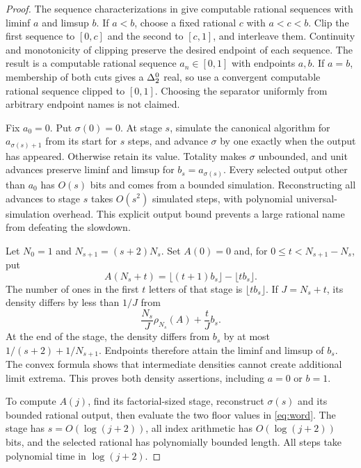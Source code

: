 \begin{proof}
The sequence characterizations in
\cite[Theorem~5.1 and Corollaries~5.4--5.5]{density} give computable
rational sequences with liminf $a$ and limsup $b$. If $a<b$, choose a
fixed rational $c$ with $a<c<b$. Clip the first sequence to $[0,c]$ and
the second to $[c,1]$, and interleave them. Continuity and monotonicity
of clipping preserve the desired endpoint of each sequence. The result
is a computable rational sequence $a_n\in[0,1]$ with endpoints $a,b$.
If $a=b$, membership of both cuts gives a $\Delta^0_2$ real, so use a
convergent computable rational sequence clipped to $[0,1]$. Choosing the
separator uniformly from arbitrary endpoint names is not claimed.

Fix $a_0=0$. Put $\sigma(0)=0$. At stage $s$, simulate the canonical
algorithm for $a_{\sigma(s)+1}$ from its start for $s$ steps, and advance
$\sigma$ by one exactly when the output has appeared. Otherwise retain
its value. Totality makes $\sigma$ unbounded, and unit advances preserve
liminf and limsup for $b_s=a_{\sigma(s)}$. Every selected output other
than $a_0$ has $O(s)$ bits and comes from a bounded simulation.
Reconstructing all advances to stage $s$ takes $O(s^2)$ simulated steps,
with polynomial universal-simulation overhead. This explicit output
bound prevents a large rational name from defeating the slowdown.

Let $N_0=1$ and $N_{s+1}=(s+2)N_s$. Set $A(0)=0$ and, for
$0\leq t<N_{s+1}-N_s$, put
\begin{equation}\label{eq:word}
 A(N_s+t)=\lfloor(t+1)b_s\rfloor-\lfloor t b_s\rfloor.
\end{equation}
The number of ones in the first $t$ letters of that stage is
$\lfloor t b_s\rfloor$. If $J=N_s+t$, its density differs by less than
$1/J$ from
\begin{equation}\label{eq:convex}
 \frac{N_s}{J}\rho_{N_s}(A)+\frac{t}{J}b_s.
\end{equation}
At the end of the stage, the density differs from $b_s$ by at most
$1/(s+2)+1/N_{s+1}$. Endpoints therefore attain the liminf and limsup
of $b_s$. The convex formula shows that intermediate densities cannot
create additional limit extrema. This proves both density assertions,
including $a=0$ or $b=1$.

To compute $A(j)$, find its factorial-sized stage, reconstruct
$\sigma(s)$ and its bounded rational output, then evaluate the two floor
values in \eqref{eq:word}. The stage has $s=O(\log(j+2))$, all index
arithmetic has $O(\log(j+2))$ bits, and the selected rational has
polynomially bounded length. All steps take polynomial time in
$\log(j+2)$.
\end{proof}

